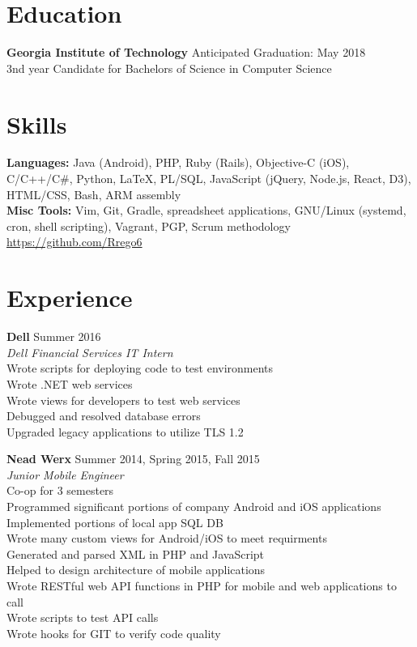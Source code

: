 \documentclass[line, margin]{res}
\begin{document}

\address{402 Roberts Way \\ Rincon, GA 31326 \\ (912) 346 6060\\ \href{mailto:rrego@gatech.edu}{\textbf{rrego@gatech.edu}}}

\begin{resume}

\section{Education}
\textbf{Georgia Institute of Technology} \hfill Anticipated Graduation: May 2018 \\
3nd year Candidate for Bachelors of Science in Computer Science

\section{Skills}
\textbf{Languages:} Java (Android), PHP, Ruby (Rails), Objective-C (iOS), C/C++/C\#, Python, LaTeX, PL/SQL, JavaScript (jQuery, Node.js, React, D3), HTML/CSS, Bash, ARM assembly \\
\textbf{Misc Tools:} Vim, Git, Gradle, spreadsheet applications, GNU/Linux (systemd, cron, shell scripting), Vagrant, PGP, Scrum methodology\\
\url{https://github.com/Rrego6}

\section{Experience}
\textbf{Dell} \hfill Summer 2016 \\
\textit{Dell Financial Services IT Intern} \\
Wrote scripts for deploying code to test environments \\
Wrote .NET web services \\
Wrote views for developers to test web services \\
Debugged and resolved database errors \\
Upgraded legacy applications to utilize TLS 1.2

\textbf{Nead Werx} \hfill Summer 2014, Spring 2015, Fall 2015 \\
\textit{Junior Mobile Engineer} \\
Co-op for 3 semesters \\
Programmed significant portions of company Android and iOS applications \\
Implemented portions of local app SQL DB \\
Wrote many custom views for Android/iOS to meet requirments \\
Generated and parsed XML in PHP and JavaScript \\
Helped to design architecture of mobile applications\\
Wrote RESTful web API functions in PHP for mobile and web applications to call \\
Wrote scripts to test API calls \\
Wrote hooks for GIT to verify code quality


\end{resume}
\end{document}
